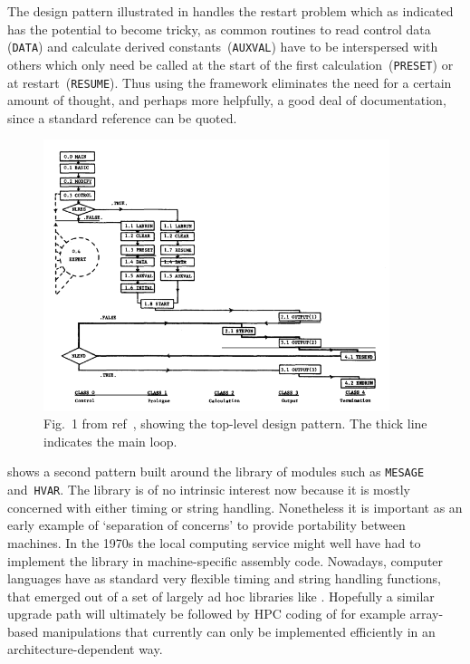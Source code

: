 The design pattern illustrated in  handles the restart problem
which as indicated has the potential to become tricky, as common routines to read
control data ({\tt DATA}) and calculate derived constants~({\tt AUXVAL}) have
to be interspersed with others which only need be called at the
start of the first calculation~({\tt PRESET}) or at restart~({\tt RESUME}).
Thus using the framework eliminates the need for a certain amount of thought,
and perhaps more helpfully, a good deal of documentation, since a standard
reference can be quoted.
\begin{figure}
\centerline{\includegraphics[width=0.9\textwidth]{../pics/cronos}}
\caption{Fig.~1 from ref~\protect\cite{Ch74Stan}, showing
the top-level design pattern. The thick line indicates
the main loop.\label{fig:cronos}}
\end{figure}

 shows a second pattern built around the 
library of modules such as {\tt MESAGE} and~{\tt HVAR}.
The library is of no intrinsic interest now because it is mostly
concerned with either timing or string handling. Nonetheless it is important
as an early example of `separation of concerns' to provide portability
between machines.  In the 1970s the local computing service
might well have had to implement the  library in machine-specific
assembly code.  Nowadays, computer languages have as standard very flexible
timing and string handling functions, that emerged out of a set of largely
ad hoc libraries like .  Hopefully a similar upgrade path will 
ultimately be followed by HPC coding of for example array-based manipulations
that currently can only be implemented efficiently in an architecture-dependent way.


